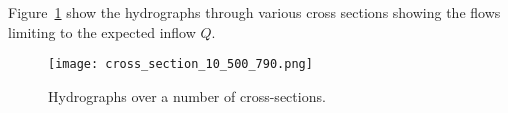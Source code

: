 Figure~\ref{fig:hydrographs} show the hydrographs through various cross sections showing the flows limiting to the 
expected inflow $Q$. 

\begin{figure}
\begin{center}
\texttt{[image: cross\_section\_10\_500\_790.png]}
\caption{Hydrographs over a number of cross-sections.}
\label{fig:hydrographs}
\end{center}
\end{figure}




\endinput

